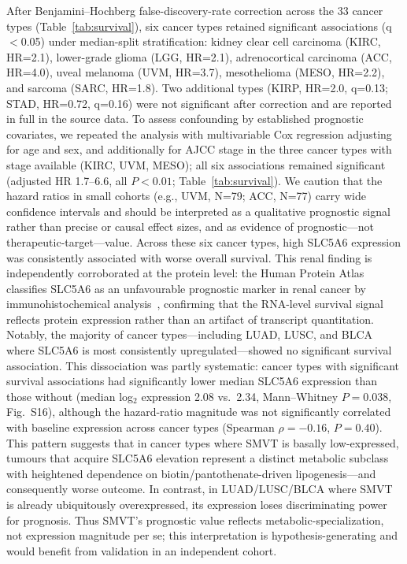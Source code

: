 \documentclass[10pt,letterpaper]{article}
\begin{document}
After Benjamini--Hochberg false-discovery-rate correction across the 33 cancer types (Table~\ref{tab:survival}), six cancer types retained significant associations (q$<$0.05) under median-split stratification: kidney clear cell carcinoma (KIRC, HR=2.1), lower-grade glioma (LGG, HR=2.1), adrenocortical carcinoma (ACC, HR=4.0), uveal melanoma (UVM, HR=3.7), mesothelioma (MESO, HR=2.2), and sarcoma (SARC, HR=1.8). Two additional types (KIRP, HR=2.0, q=0.13; STAD, HR=0.72, q=0.16) were not significant after correction and are reported in full in the source data. To assess confounding by established prognostic covariates, we repeated the analysis with multivariable Cox regression adjusting for age and sex, and additionally for AJCC stage in the three cancer types with stage available (KIRC, UVM, MESO); all six associations remained significant (adjusted HR 1.7--6.6, all $P<0.01$; Table~\ref{tab:survival}). We caution that the hazard ratios in small cohorts (e.g., UVM, N=79; ACC, N=77) carry wide confidence intervals and should be interpreted as a qualitative prognostic signal rather than precise or causal effect sizes, and as evidence of prognostic---not therapeutic-target---value. Across these six cancer types, high SLC5A6 expression was consistently associated with worse overall survival. This renal finding is independently corroborated at the protein level: the Human Protein Atlas classifies SLC5A6 as an unfavourable prognostic marker in renal cancer by immunohistochemical analysis~\cite{uhlens2015}, confirming that the RNA-level survival signal reflects protein expression rather than an artifact of transcript quantitation. Notably, the majority of cancer types---including LUAD, LUSC, and BLCA where SLC5A6 is most consistently upregulated---showed no significant survival association. This dissociation was partly systematic: cancer types with significant survival associations had significantly lower median SLC5A6 expression than those without (median log$_2$ expression 2.08 vs.\ 2.34, Mann--Whitney $P=0.038$, Fig.~S16), although the hazard-ratio magnitude was not significantly correlated with baseline expression across cancer types (Spearman $\rho=-0.16$, $P=0.40$). This pattern suggests that in cancer types where SMVT is basally low-expressed, tumours that acquire SLC5A6 elevation represent a distinct metabolic subclass with heightened dependence on biotin/pantothenate-driven lipogenesis---and consequently worse outcome. In contrast, in LUAD/LUSC/BLCA where SMVT is already ubiquitously overexpressed, its expression loses discriminating power for prognosis. Thus SMVT's prognostic value reflects metabolic-specialization, not expression magnitude per se; this interpretation is hypothesis-generating and would benefit from validation in an independent cohort.
\end{document}
